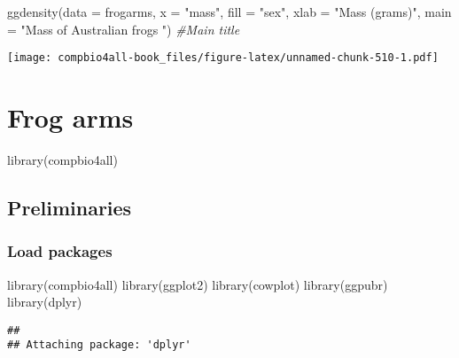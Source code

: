 \documentclass[
]{book}
\newenvironment{Shaded}{\begin{snugshade}}{\end{snugshade}}
\newcommand{\AttributeTok}[1]{\textcolor[rgb]{0.77,0.63,0.00}{#1}}
\newcommand{\CommentTok}[1]{\textcolor[rgb]{0.56,0.35,0.01}{\textit{#1}}}
\newcommand{\FunctionTok}[1]{\textcolor[rgb]{0.00,0.00,0.00}{#1}}
\newcommand{\NormalTok}[1]{#1}
\newcommand{\StringTok}[1]{\textcolor[rgb]{0.31,0.60,0.02}{#1}}
\begin{document}
\begin{Shaded}
\begin{Highlighting}[]
\FunctionTok{ggdensity}\NormalTok{(}\AttributeTok{data =}\NormalTok{ frogarms,}
            \AttributeTok{x =} \StringTok{"mass"}\NormalTok{,}
            \AttributeTok{fill =} \StringTok{"sex"}\NormalTok{,}
            \AttributeTok{xlab =} \StringTok{"Mass (grams)"}\NormalTok{,}
          \AttributeTok{main =} \StringTok{"Mass of Australian frogs "}\NormalTok{) }\CommentTok{\#Main title}
\end{Highlighting}
\end{Shaded}

\texttt{[image: compbio4all-book\_files/figure-latex/unnamed-chunk-510-1.pdf]}

\hypertarget{frog-arms}{%
\chapter{Frog arms}\label{frog-arms}}

\begin{Shaded}
\begin{Highlighting}[]
\FunctionTok{library}\NormalTok{(compbio4all)}
\end{Highlighting}
\end{Shaded}

\hypertarget{preliminaries-12}{%
\section{Preliminaries}\label{preliminaries-12}}

\hypertarget{load-packages-2}{%
\subsection{Load packages}\label{load-packages-2}}

\begin{Shaded}
\begin{Highlighting}[]
\FunctionTok{library}\NormalTok{(compbio4all)}
\FunctionTok{library}\NormalTok{(ggplot2)}
\FunctionTok{library}\NormalTok{(cowplot)}
\FunctionTok{library}\NormalTok{(ggpubr)}
\FunctionTok{library}\NormalTok{(dplyr)}
\end{Highlighting}
\end{Shaded}

\begin{verbatim}
## 
## Attaching package: 'dplyr'
\end{verbatim}
\end{document}
